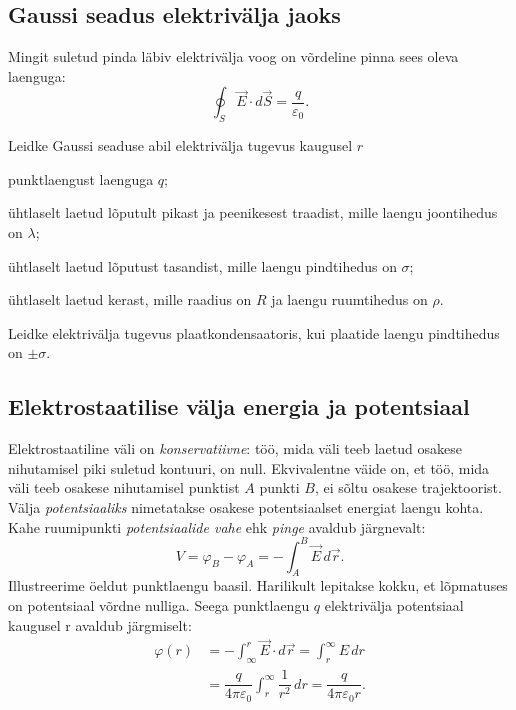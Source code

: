 \documentclass[a4paper,11pt,twocolumn]{article}
\begin{document}
\subsection{Gaussi seadus elektrivälja jaoks}
Mingit suletud pinda läbiv elektrivälja voog on võrdeline pinna sees oleva laenguga:
\begin{equation*}
    \oint_S\vec{E}\cdot d\vec{S}=\frac{q}{\varepsilon_0} \tag{I Maxwelli võrrand}.
\end{equation*}
\begin{question}
    Leidke Gaussi seaduse abil elektrivälja tugevus kaugusel $r$
    \begin{subquestion}
    \item punktlaengust laenguga \( q \);
    \item ühtlaselt laetud lõputult pikast ja peenikesest traadist, mille laengu joontihedus on $\lambda$;
    \item ühtlaselt laetud lõputust tasandist, mille laengu pindtihedus on $\sigma$;
    \item ühtlaselt laetud kerast, mille raadius on $R$ ja laengu ruumtihedus on $\rho$.
    \end{subquestion}
\end{question}

\begin{question}
    Leidke elektrivälja tugevus plaatkondensaatoris, kui plaatide laengu pindtihedus on $\pm\sigma$.
\end{question}

\subsection{Elektrostaatilise välja energia ja potentsiaal}
Elektrostaatiline väli on \textit{konservatiivne}: töö, mida väli teeb laetud osakese nihutamisel piki suletud kontuuri, on null. Ekvivalentne väide on, et töö, mida väli teeb osakese nihutamisel punktist \( A \) punkti \( B \), ei sõltu osakese trajektoorist. Välja \textit{potentsiaaliks} nimetatakse osakese potentsiaalset energiat laengu kohta. Kahe ruumipunkti \textit{potentsiaalide vahe} ehk \textit{pinge} avaldub järgnevalt:
\[ V=\varphi_B-\varphi_A=-\int_{A}^{B} \vec{E}\, d\vec{r}.\]
Illustreerime öeldut punktlaengu baasil. Harilikult lepitakse kokku, et lõpmatuses on potentsiaal võrdne nulliga. Seega punktlaengu \( q \) elektrivälja potentsiaal kaugusel r avaldub järgmiselt:
\begin{align*}
    \varphi(r)&=-\int_{\infty}^{r}\vec{E}\cdot d\vec{r}=\int_{r}^{\infty}{E}\, dr\\
    &=\dfrac{q}{4\pi\varepsilon_0}\int_{r}^{\infty}\dfrac{1}{r^2}\, dr=\dfrac{q}{4\pi\varepsilon_0 r}.
\end{align*}
\end{document}
